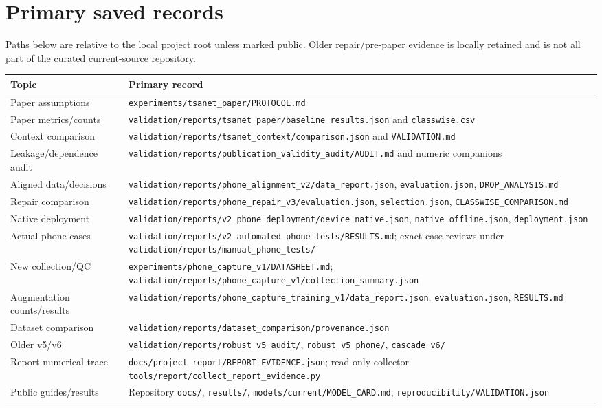 \documentclass[11pt,a4paper,oneside]{report}
\newcommand{\code}[1]{\nolinkurl{#1}}
\begin{document}
\section{Primary saved records}
Paths below are relative to the local project root unless marked public. Older repair/pre-paper evidence is locally retained and is not all part of the curated current-source repository.
\begin{longtable}{p{}p{}}
\toprule Topic & Primary record\\\midrule\endhead
Paper assumptions & \code{experiments/tsanet_paper/PROTOCOL.md}\\
Paper metrics/counts & \code{validation/reports/tsanet_paper/baseline_results.json} and \code{classwise.csv}\\
Context comparison & \code{validation/reports/tsanet_context/comparison.json} and \code{VALIDATION.md}\\
Leakage/dependence audit & \code{validation/reports/publication_validity_audit/AUDIT.md} and numeric companions\\
Aligned data/decisions & \code{validation/reports/phone_alignment_v2/data_report.json}, \code{evaluation.json}, \code{DROP_ANALYSIS.md}\\
Repair comparison & \code{validation/reports/phone_repair_v3/evaluation.json}, \code{selection.json}, \code{CLASSWISE_COMPARISON.md}\\
Native deployment & \code{validation/reports/v2_phone_deployment/device_native.json}, \code{native_offline.json}, \code{deployment.json}\\
Actual phone cases & \code{validation/reports/v2_automated_phone_tests/RESULTS.md}; exact case reviews under \code{validation/reports/manual_phone_tests/}\\
New collection/QC & \code{experiments/phone_capture_v1/DATASHEET.md}; \code{validation/reports/phone_capture_v1/collection_summary.json}\\
Augmentation counts/results & \code{validation/reports/phone_capture_training_v1/data_report.json}, \code{evaluation.json}, \code{RESULTS.md}\\
Dataset comparison & \code{validation/reports/dataset_comparison/provenance.json}\\
Older v5/v6 & \code{validation/reports/robust_v5_audit/}, \code{robust_v5_phone/}, \code{cascade_v6/}\\
Report numerical trace & \code{docs/project_report/REPORT_EVIDENCE.json}; read-only collector \code{tools/report/collect_report_evidence.py}\\
Public guides/results & Repository \code{docs/}, \code{results/}, \code{models/current/MODEL_CARD.md}, \code{reproducibility/VALIDATION.json}\\
\bottomrule
\end{longtable}
\end{document}

